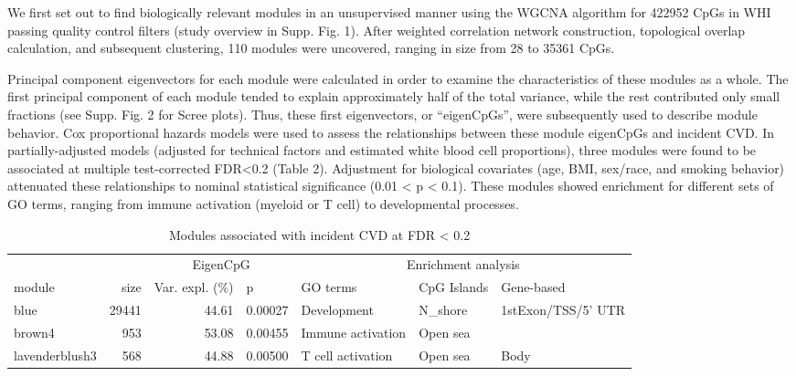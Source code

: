 \documentclass[]{article}
\theoremstyle{definition}
\theoremstyle{definition}
\theoremstyle{definition}
\theoremstyle{remark}
\begin{document}
We first set out to find biologically relevant modules in an
unsupervised manner using the WGCNA algorithm for 422952 CpGs in WHI
passing quality control filters (study overview in Supp. Fig. 1). After
weighted correlation network construction, topological overlap
calculation, and subsequent clustering, 110 modules were uncovered,
ranging in size from 28 to 35361 CpGs.

Principal component eigenvectors for each module were calculated in
order to examine the characteristics of these modules as a whole. The
first principal component of each module tended to explain approximately
half of the total variance, while the rest contributed only small
fractions (see Supp. Fig. 2 for Scree plots). Thus, these first
eigenvectors, or ``eigenCpGs'', were subsequently used to describe
module behavior. Cox proportional hazards models were used to assess the
relationships between these module eigenCpGs and incident CVD. In
partially-adjusted models (adjusted for technical factors and estimated
white blood cell proportions), three modules were found to be associated
at multiple test-corrected FDR\textless{}0.2 (Table 2). Adjustment for
biological covariates (age, BMI, sex/race, and smoking behavior)
attenuated these relationships to nominal statistical significance (0.01
\textless{} p \textless{} 0.1). These modules showed enrichment for
different sets of GO terms, ranging from immune activation (myeloid or T
cell) to developmental processes.

\begin{table}

\caption{\label{tab:sig-module-table}Modules associated with incident CVD at FDR < 0.2}
\centering
\begin{tabular}[t]{lrrllll}
\toprule
\multicolumn{1}{c}{} & \multicolumn{1}{c}{} & \multicolumn{2}{c}{EigenCpG} & \multicolumn{3}{c}{Enrichment analysis} \\
\cmidrule(l{2pt}r{2pt}){3-4} \cmidrule(l{2pt}r{2pt}){5-7}
module & size & Var. expl. (\%) & p & GO terms & CpG Islands & Gene-based\\
\midrule
blue & 29441 & 44.61 & 0.00027 & Development & N\_shore & 1stExon/TSS/5' UTR\\
brown4 & 953 & 53.08 & 0.00455 & Immune activation & Open sea & \\
lavenderblush3 & 568 & 44.88 & 0.00500 & T cell activation & Open sea & Body\\
\bottomrule
\end{tabular}
\end{table}
\end{document}
